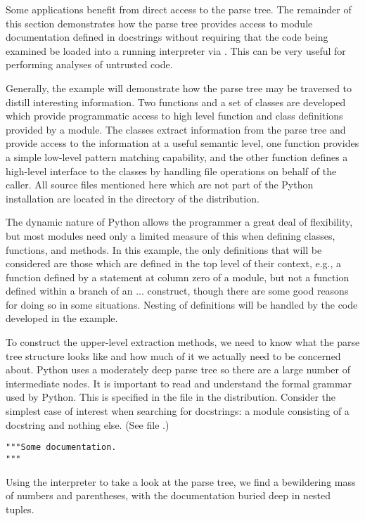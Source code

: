 Some applications benefit from direct access to the parse tree.  The
remainder of this section demonstrates how the parse tree provides
access to module documentation defined in docstrings without requiring
that the code being examined be loaded into a running interpreter via
.  This can be very useful for performing analyses of
untrusted code.

Generally, the example will demonstrate how the parse tree may be
traversed to distill interesting information.  Two functions and a set
of classes are developed which provide programmatic access to high
level function and class definitions provided by a module.  The
classes extract information from the parse tree and provide access to
the information at a useful semantic level, one function provides a
simple low-level pattern matching capability, and the other function
defines a high-level interface to the classes by handling file
operations on behalf of the caller.  All source files mentioned here
which are not part of the Python installation are located in the
 directory of the distribution.

The dynamic nature of Python allows the programmer a great deal of
flexibility, but most modules need only a limited measure of this when
defining classes, functions, and methods.  In this example, the only
definitions that will be considered are those which are defined in the
top level of their context, e.g., a function defined by a 
statement at column zero of a module, but not a function defined
within a branch of an  ...  construct, though
there are some good reasons for doing so in some situations.  Nesting
of definitions will be handled by the code developed in the example.

To construct the upper-level extraction methods, we need to know what
the parse tree structure looks like and how much of it we actually
need to be concerned about.  Python uses a moderately deep parse tree
so there are a large number of intermediate nodes.  It is important to
read and understand the formal grammar used by Python.  This is
specified in the file  in the distribution.
Consider the simplest case of interest when searching for docstrings:
a module consisting of a docstring and nothing else.  (See file
.)

\begin{verbatim}
"""Some documentation.
"""
\end{verbatim}
%
Using the interpreter to take a look at the parse tree, we find a
bewildering mass of numbers and parentheses, with the documentation
buried deep in nested tuples.

